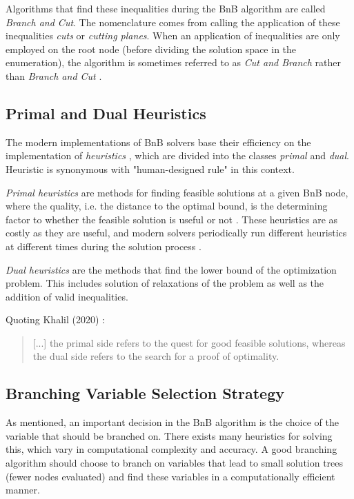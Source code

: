 Algorithms that find these inequalities during the \gls{BnB} algorithm are called \textit{Branch and Cut}. The nomenclature comes from calling the application of these inequalities \textit{cuts} or \textit{cutting planes}.
When an application of inequalities are only employed on the root node (before dividing the solution space in the enumeration), the algorithm is sometimes referred to as \textit{Cut and Branch} rather than \textit{Branch and Cut} \cite{wolsey2020integer}.






\subsection{Primal and Dual Heuristics}

The modern implementations of \gls{BnB} solvers base their efficiency on the implementation of \textit{heuristics} \cite{khalil2020towards}, which are divided into the classes \textit{primal} and \textit{ dual}. Heuristic is synonymous with "human-designed rule" in this context.

\textit{Primal heuristics} are methods for finding feasible solutions at a given \gls{BnB} node, where the quality, i.e. the distance to the optimal bound, is the determining factor to whether the feasible solution is useful or not \cite{khalil2020towards}. These heuristics are as costly as they are useful, and modern solvers periodically run different heuristics at different times during the solution process \cite{khalil2020towards}.

\textit{Dual heuristics} are the methods that find the lower bound of the optimization problem. This includes solution of relaxations of the problem as well as the addition of valid inequalities. 

Quoting Khalil (2020) \cite{khalil2020towards}:
\begin{quote}
    [...] the
primal side refers to the quest for good feasible solutions, whereas the dual side refers to
the search for a proof of optimality.
\end{quote}






\subsection{Branching Variable Selection Strategy}\label{ssec:branchingstrategy}

As mentioned, an important decision in the \gls{BnB} algorithm is the choice of the variable that should be branched on. 
There exists many heuristics for solving this, which vary in computational complexity and accuracy. 
A good branching algorithm should choose to branch on variables that lead to small solution trees (fewer nodes evaluated) and find these variables in a computationally efficient manner. 

